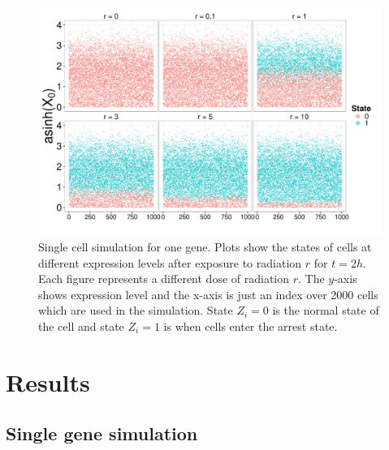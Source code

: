 \begin{figure}[!t]
  \centering
  \includegraphics[width=1\textwidth]{pics/cell-cycle-sim1.pdf}
  \caption{Single cell simulation for one gene. Plots show the states of cells at different expression levels after exposure to radiation $r$ for $t=2h$. Each figure represents a different dose of radiation $r$. The $y$-axis shows expression level and the x-axis is just an index over 2000 cells which are used in the simulation. State $Z_i = 0$ is the normal state of the cell and state $Z_i =1$ is when cells enter the arrest state. }
  \label{fig:rad-single-gene}
\end{figure}

\section{Results}
\label{sec:results-cc}

\subsection{Single gene simulation}
\label{sec:single-gene-simul}

